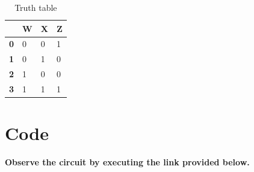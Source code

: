 \documentclass[journal,12pt,twocolumn]{IEEEtran}
\begin{document}
\begin{table}[ht]
\centering
\begin{tabular}{|l|l|l|l|}
\hline
 & \textbf{W} & \textbf{X} & \textbf{Z} \\ \hline
\textbf{0} & 0 & 0 & 1 \\ \hline
\textbf{1} & 0 & 1 & 0 \\ \hline
\textbf{2} & 1 & 0 & 0 \\ \hline
\textbf{3} & 1 & 1 & 1 \\ \hline
\end{tabular}%
\caption{Truth table}
\label{Truth table}
\end{table}
\section{Code}

\textbf{Observe the circuit by executing the link provided below.}\\
\begin{center}
\end{center}
\end{document}
